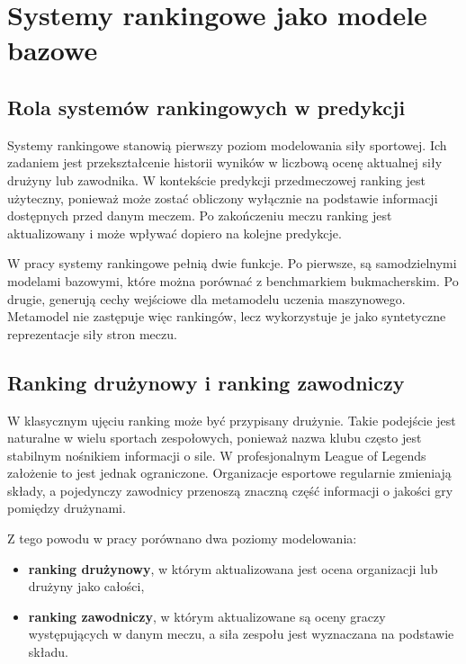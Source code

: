 \chapter{Systemy rankingowe jako modele bazowe}

\section{Rola systemów rankingowych w predykcji}

Systemy rankingowe stanowią pierwszy poziom modelowania siły sportowej. Ich zadaniem jest przekształcenie historii wyników w liczbową ocenę aktualnej siły drużyny lub zawodnika. W kontekście predykcji przedmeczowej ranking jest użyteczny, ponieważ może zostać obliczony wyłącznie na podstawie informacji dostępnych przed danym meczem. Po zakończeniu meczu ranking jest aktualizowany i może wpływać dopiero na kolejne predykcje.

W pracy systemy rankingowe pełnią dwie funkcje. Po pierwsze, są samodzielnymi modelami bazowymi, które można porównać z benchmarkiem bukmacherskim. Po drugie, generują cechy wejściowe dla metamodelu uczenia maszynowego. Metamodel nie zastępuje więc rankingów, lecz wykorzystuje je jako syntetyczne reprezentacje siły stron meczu.

\section{Ranking drużynowy i ranking zawodniczy}

W klasycznym ujęciu ranking może być przypisany drużynie. Takie podejście jest naturalne w wielu sportach zespołowych, ponieważ nazwa klubu często jest stabilnym nośnikiem informacji o sile. W profesjonalnym League of Legends założenie to jest jednak ograniczone. Organizacje esportowe regularnie zmieniają składy, a pojedynczy zawodnicy przenoszą znaczną część informacji o jakości gry pomiędzy drużynami.

Z tego powodu w pracy porównano dwa poziomy modelowania:

\begin{itemize}
    \item \textbf{ranking drużynowy}, w którym aktualizowana jest ocena organizacji lub drużyny jako całości,
    \item \textbf{ranking zawodniczy}, w którym aktualizowane są oceny graczy występujących w danym meczu, a siła zespołu jest wyznaczana na podstawie składu.
\end{itemize}

